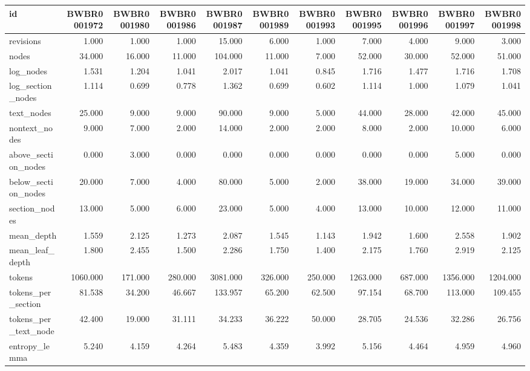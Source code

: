 \begin{tabular}{lrrrrrrrrrr}
\toprule
id & BWBR0001972 & BWBR0001980 & BWBR0001986 & BWBR0001987 & BWBR0001989 & BWBR0001993 & BWBR0001995 & BWBR0001996 & BWBR0001997 & BWBR0001998 \\
\midrule
revisions & 1.000 & 1.000 & 1.000 & 15.000 & 6.000 & 1.000 & 7.000 & 4.000 & 9.000 & 3.000 \\
\cline{1-11}
nodes & 34.000 & 16.000 & 11.000 & 104.000 & 11.000 & 7.000 & 52.000 & 30.000 & 52.000 & 51.000 \\
\cline{1-11}
log\_nodes & 1.531 & 1.204 & 1.041 & 2.017 & 1.041 & 0.845 & 1.716 & 1.477 & 1.716 & 1.708 \\
\cline{1-11}
log\_section\_nodes & 1.114 & 0.699 & 0.778 & 1.362 & 0.699 & 0.602 & 1.114 & 1.000 & 1.079 & 1.041 \\
\cline{1-11}
text\_nodes & 25.000 & 9.000 & 9.000 & 90.000 & 9.000 & 5.000 & 44.000 & 28.000 & 42.000 & 45.000 \\
\cline{1-11}
nontext\_nodes & 9.000 & 7.000 & 2.000 & 14.000 & 2.000 & 2.000 & 8.000 & 2.000 & 10.000 & 6.000 \\
\cline{1-11}
above\_section\_nodes & 0.000 & 3.000 & 0.000 & 0.000 & 0.000 & 0.000 & 0.000 & 0.000 & 5.000 & 0.000 \\
\cline{1-11}
below\_section\_nodes & 20.000 & 7.000 & 4.000 & 80.000 & 5.000 & 2.000 & 38.000 & 19.000 & 34.000 & 39.000 \\
\cline{1-11}
section\_nodes & 13.000 & 5.000 & 6.000 & 23.000 & 5.000 & 4.000 & 13.000 & 10.000 & 12.000 & 11.000 \\
\cline{1-11}
mean\_depth & 1.559 & 2.125 & 1.273 & 2.087 & 1.545 & 1.143 & 1.942 & 1.600 & 2.558 & 1.902 \\
\cline{1-11}
mean\_leaf\_depth & 1.800 & 2.455 & 1.500 & 2.286 & 1.750 & 1.400 & 2.175 & 1.760 & 2.919 & 2.125 \\
\cline{1-11}
tokens & 1060.000 & 171.000 & 280.000 & 3081.000 & 326.000 & 250.000 & 1263.000 & 687.000 & 1356.000 & 1204.000 \\
\cline{1-11}
tokens\_per\_section & 81.538 & 34.200 & 46.667 & 133.957 & 65.200 & 62.500 & 97.154 & 68.700 & 113.000 & 109.455 \\
\cline{1-11}
tokens\_per\_text\_node & 42.400 & 19.000 & 31.111 & 34.233 & 36.222 & 50.000 & 28.705 & 24.536 & 32.286 & 26.756 \\
\cline{1-11}
entropy\_lemma & 5.240 & 4.159 & 4.264 & 5.483 & 4.359 & 3.992 & 5.156 & 4.464 & 4.959 & 4.960 \\

\end{tabular}
